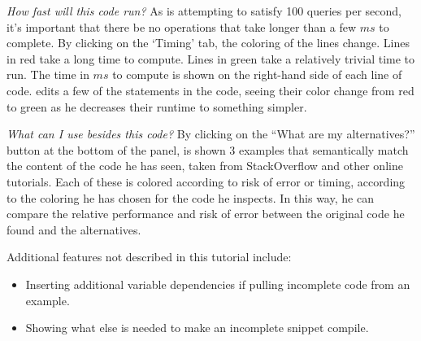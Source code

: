 \emph{How fast will this code run?}
As \user{} is attempting to satisfy 100 queries per second, it's important that there be no operations that take longer than a few $ms$ to complete.
By clicking on the `Timing' tab, the coloring of the lines change.
Lines in red take a long time to compute.
Lines in green take a relatively trivial time to run.
The time in $ms$ to compute is shown on the right-hand side of each line of code.
\user{} edits a few of the statements in the code, seeing their color change from red to green as he decreases their runtime to something simpler.

\emph{What can I use besides this code?}
By clicking on the ``What are my alternatives?'' button at the bottom of the panel, \user{} is shown 3 examples that semantically match the content of the code he has seen, taken from StackOverflow and other online tutorials.
Each of these is colored according to risk of error or timing, according to the coloring he has chosen for the code he inspects.
In this way, he can compare the relative performance and risk of error between the original code he found and the alternatives.

Additional features not described in this tutorial include:
\begin{itemize}
\item Inserting additional variable dependencies if pulling incomplete code from an example.
\item Showing what else is needed to make an incomplete snippet compile.
\end{itemize}
